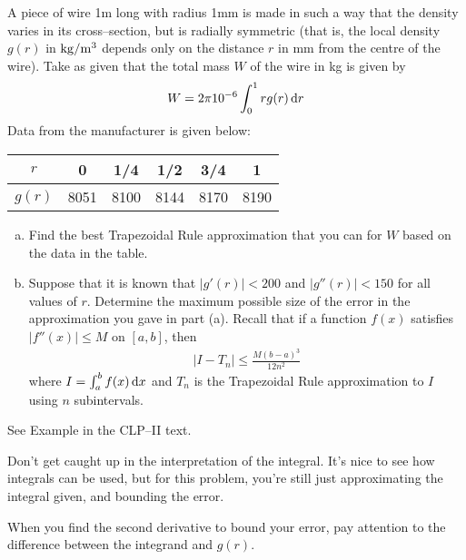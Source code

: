\begin{Mquestion}[2002A,M121 2002A]
A piece of wire 1m long with radius 1mm is made in such
a way that the density varies in its cross--section, but is radially symmetric
(that is, the local density $g(r)$ in ${\rm kg/m^3}$ depends only on the
distance $r$ in mm from the centre of the wire). Take as given that the
total mass $W$ of the wire in kg is given by
\begin{align*}
W=2\pi 10^{-6}\int_0^1 rg(r)\,\mathrm{d}r
\end{align*}
Data from the manufacturer is given below:

\renewcommand{\arraystretch}{1.1}
\begin{center}
     \begin{tabular}{|c|c|c|c|c|c|}
          \hline
          $r$ &0&1/4&1/2&3/4&1 \\
          \hline
          $g(r)$ &8051&8100&8144&8170&8190\\
          \hline
     \end{tabular}
\end{center}
\renewcommand{\arraystretch}{1.0}

\begin{enumerate}[(a)]
\item
Find the best Trapezoidal Rule approximation that you
can for $W$ based on the data in the table.
\item
Suppose that it is known that $|g'(r)|<200$ and
$|g''(r)|<150$ for all values of $r$. Determine the maximum possible size
of the error in the approximation you gave in part (a). Recall that if
a function $f(x)$ satisfies $|f''(x)|\le M$ on $[a,b]$, then
\begin{align*}
|I-T_n|\le\frac{M(b-a)^3}{12n^2}
\end{align*}
where $I=\int_a^b f(x)\,\mathrm{d}x$ and $T_n$ is the Trapezoidal Rule approximation
to $I$ using $n$ subintervals.
\end{enumerate}
\end{Mquestion}

\begin{hint}
See Example  in the
CLP--II text.

Don't get caught up in the interpretation of the integral. It's nice to see how integrals can be used, but for this problem, you're still just approximating the integral given, and bounding the error.

When you find the second derivative to bound your error, pay attention to the difference between the integrand and $g(r)$.
\end{hint}

